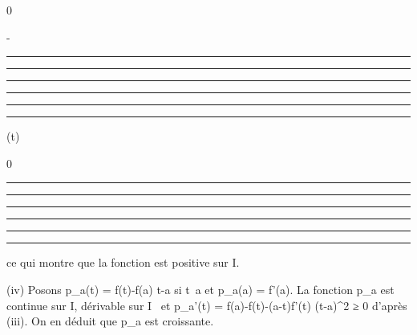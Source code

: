 \documentclass[]{article}
\begin{document}
0

-

\begin{center}\rule{3in}{0.4pt}\end{center}

\begin{center}\rule{3in}{0.4pt}\end{center}

\begin{center}\rule{3in}{0.4pt}\end{center}

\begin{center}\rule{3in}{0.4pt}\end{center}

\begin{center}\rule{3in}{0.4pt}\end{center}

\begin{center}\rule{3in}{0.4pt}\end{center}

\phi(t)

\searrow

0

\nearrow

\begin{center}\rule{3in}{0.4pt}\end{center}

\begin{center}\rule{3in}{0.4pt}\end{center}

\begin{center}\rule{3in}{0.4pt}\end{center}

\begin{center}\rule{3in}{0.4pt}\end{center}

\begin{center}\rule{3in}{0.4pt}\end{center}

\begin{center}\rule{3in}{0.4pt}\end{center}

ce qui montre que la fonction \phi est positive sur I.

(iv) Posons p_a(t) = f(t)-f(a) \over t-a si
t\neq~a et p_a(a) = f'(a). La fonction
p_a est continue sur I, dérivable sur I
\diagdown\a\ et p_a'(t) =
f(a)-f(t)-(a-t)f'(t) \over (t-a)^2 ≥ 0
d'après (iii). On en déduit que p_a est croissante.
\end{document}
